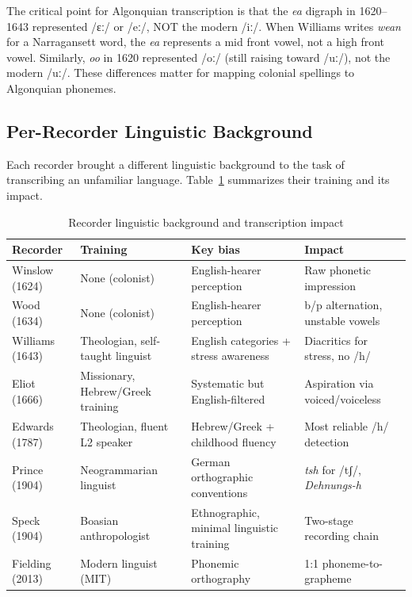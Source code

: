The critical point for Algonquian transcription is that the \textit{ea}
digraph in 1620--1643 represented /ɛː/ or /eː/, NOT the modern /iː/. When
Williams writes \textit{wean} for a Narragansett word, the \textit{ea}
represents a mid front vowel, not a high front vowel. Similarly,
\textit{oo} in 1620 represented /oː/ (still raising toward /uː/), not the
modern /uː/. These differences matter for mapping colonial spellings to
Algonquian phonemes.

\subsection{Per-Recorder Linguistic Background}

Each recorder brought a different linguistic background to the task of
transcribing an unfamiliar language. Table~\ref{tab:recorder-background}
summarizes their training and its impact.

\begin{table}[h]
\centering
\caption{Recorder linguistic background and transcription impact}
\label{tab:recorder-background}
\begin{tabular}{llll}
\toprule
\textbf{Recorder} & \textbf{Training} & \textbf{Key bias} & \textbf{Impact} \\
\midrule
Winslow (1624) & None (colonist) & English-hearer perception & Raw phonetic impression \\
Wood (1634) & None (colonist) & English-hearer perception & b/p alternation, unstable vowels \\
Williams (1643) & Theologian, self-taught linguist & English categories + stress awareness & Diacritics for stress, no /h/ \\
Eliot (1666) & Missionary, Hebrew/Greek training & Systematic but English-filtered & Aspiration via voiced/voiceless \\
Edwards (1787) & Theologian, fluent L2 speaker & Hebrew/Greek + childhood fluency & Most reliable /h/ detection \\
Prince (1904) & Neogrammarian linguist & German orthographic conventions & \textit{tsh} for /tʃ/, \textit{Dehnungs-h} \\
Speck (1904) & Boasian anthropologist & Ethnographic, minimal linguistic training & Two-stage recording chain \\
Fielding (2013) & Modern linguist (MIT) & Phonemic orthography & 1:1 phoneme-to-grapheme \\
\bottomrule
\end{tabular}
\end{table}

